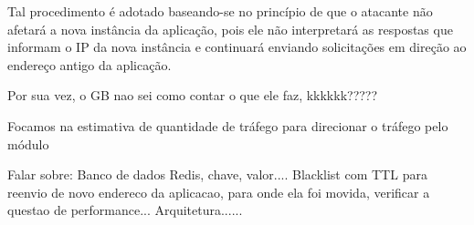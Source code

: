 \documentclass[a4paper, 12pt]{article}
\begin{document}
Tal procedimento é adotado baseando-se no princípio de que o atacante não afetará a nova instância da aplicação, pois ele não interpretará as respostas que informam o IP da nova instância e continuará enviando solicitações em direção ao endereço antigo da aplicação.

 
Por sua vez, o GB nao sei como contar o que ele faz, kkkkkk????? 
 




Focamos na estimativa de quantidade de tráfego para direcionar o tráfego pelo módulo 


Falar sobre:
Banco de dados Redis, chave, valor....
Blacklist com TTL para reenvio de novo endereco da aplicacao, para onde ela foi movida, verificar a questao de performance...
Arquitetura......




% 


\end{document}
